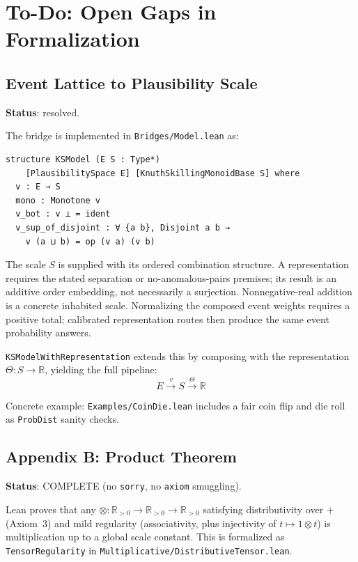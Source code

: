 \documentclass[11pt]{article}
\theoremstyle{definition}
\theoremstyle{remark}
\begin{document}
\section{To-Do: Open Gaps in Formalization}
\label{app:todo}

\subsection{Event Lattice to Plausibility Scale}

\textbf{Status}: resolved.

The bridge is implemented in \texttt{Bridges/Model.lean} as:

\begin{lstlisting}
structure KSModel (E S : Type*)
    [PlausibilitySpace E] [KnuthSkillingMonoidBase S] where
  v : E → S
  mono : Monotone v
  v_bot : v ⊥ = ident
  v_sup_of_disjoint : ∀ {a b}, Disjoint a b →
    v (a ⊔ b) = op (v a) (v b)
\end{lstlisting}

The scale $S$ is supplied with its ordered combination structure.
A representation requires the stated separation or no-anomalous-pairs premises;
its result is an additive order embedding, not necessarily a surjection.
Nonnegative-real addition is a concrete inhabited scale. Normalizing the composed
event weights requires a positive total; calibrated representation routes then
produce the same event probability answers.

\texttt{KSModelWithRepresentation} extends this by composing with the representation $\Theta : S \to \mathbb{R}$, yielding the full pipeline:
\[
E \xrightarrow{v} S \xrightarrow{\Theta} \mathbb{R}
\]

Concrete example: \texttt{Examples/CoinDie.lean} includes a fair coin flip and die roll as \texttt{ProbDist} sanity checks.

\subsection{Appendix B: Product Theorem}

\textbf{Status}: COMPLETE (no \texttt{sorry}, no \texttt{axiom} smuggling).

Lean proves that any $\otimes : \mathbb{R}_{>0}\to\mathbb{R}_{>0}\to\mathbb{R}_{>0}$ satisfying
distributivity over $+$ (Axiom~3) and mild regularity (associativity, plus injectivity of
$t \mapsto 1 \otimes t$) is multiplication up to a global scale constant.
This is formalized as \texttt{TensorRegularity} in
\texttt{Multiplicative/DistributiveTensor.lean}.
\end{document}

